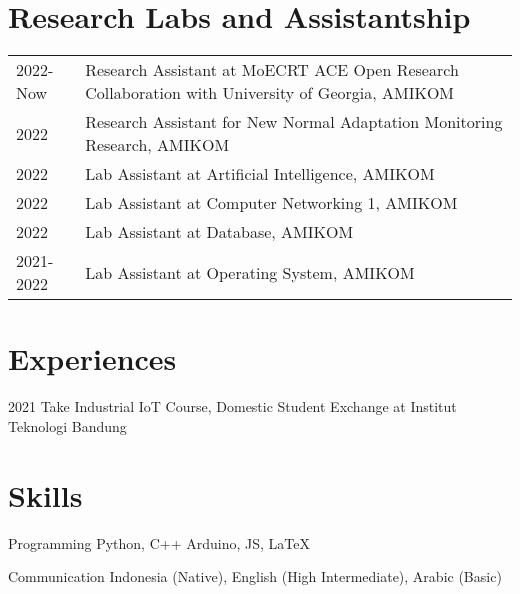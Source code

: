 \documentclass[12pt,letterpaper]{report}
\begin{document}
    \section*{Research Labs and Assistantship}
    \begin{tabular}{@{}p{3cm} p{10cm}@{}}
        2022-Now & Research Assistant at MoECRT ACE Open Research Collaboration with University of Georgia, AMIKOM \\
        2022 & Research Assistant for New Normal Adaptation Monitoring Research, AMIKOM \\
        2022 & Lab Assistant at Artificial Intelligence, AMIKOM \\
        2022 & Lab Assistant at Computer Networking 1, AMIKOM \\
        2022 & Lab Assistant at Database, AMIKOM \\
        2021-2022 & Lab Assistant at Operating System, AMIKOM \\
    \end{tabular}



    \section*{Experiences}
    \begin{tablist}
        \item[2021] \tab{}Take Industrial IoT Course, Domestic Student Exchange at Institut Teknologi Bandung
    \end{tablist}

    \section*{Skills}
    \begin{tablist}
        \item[Programming] \tab{}Python, C++ Arduino, JS, \LaTeX \\
        \item[Communication] \tab{}Indonesia (Native), English (High Intermediate), Arabic (Basic) \\
    \end{tablist}
\end{document}
